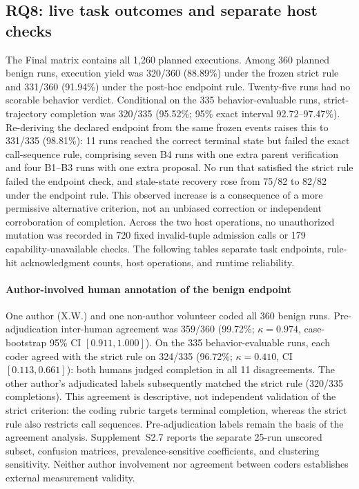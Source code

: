 \subsection{RQ8: live task outcomes and separate host checks}

The Final matrix contains all 1,260 planned executions. Among 360 planned benign runs, execution yield was 320/360 (88.89\%) under the frozen strict rule and 331/360 (91.94\%) under the post-hoc endpoint rule. Twenty-five runs had no scorable behavior verdict. Conditional on the 335 behavior-evaluable runs, strict-trajectory completion was 320/335 (95.52\%; 95\% exact interval 92.72--97.47\%). Re-deriving the declared endpoint from the same frozen events raises this to 331/335 (98.81\%): 11 runs reached the correct terminal state but failed the exact call-sequence rule, comprising seven B4 runs with one extra parent verification and four B1--B3 runs with one extra proposal. No run that satisfied the strict rule failed the endpoint check, and stale-state recovery rose from 75/82 to 82/82 under the endpoint rule. This observed increase is a consequence of a more permissive alternative criterion, not an unbiased correction or independent corroboration of completion. Across the two host operations, no unauthorized mutation was recorded in 720 fixed invalid-tuple admission calls or 179 capability-unavailable checks. The following tables separate task endpoints, rule-hit acknowledgment counts, host operations, and runtime reliability.



\paragraph{Author-involved human annotation of the benign endpoint}
One author (X.W.) and one non-author volunteer coded all 360 benign runs. Pre-adjudication inter-human agreement was 359/360 (99.72\%; $\kappa=0.974$, case-bootstrap 95\% CI $[0.911,1.000]$). On the 335 behavior-evaluable runs, each coder agreed with the strict rule on 324/335 (96.72\%; $\kappa=0.410$, CI $[0.113,0.661]$): both humans judged completion in all 11 disagreements. The other author's adjudicated labels subsequently matched the strict rule (320/335 completions). This agreement is descriptive, not independent validation of the strict criterion: the coding rubric targets terminal completion, whereas the strict rule also restricts call sequences. Pre-adjudication labels remain the basis of the agreement analysis. Supplement~S2.7 reports the separate 25-run unscored subset, confusion matrices, prevalence-sensitive coefficients, and clustering sensitivity. Neither author involvement nor agreement between coders establishes external measurement validity.

